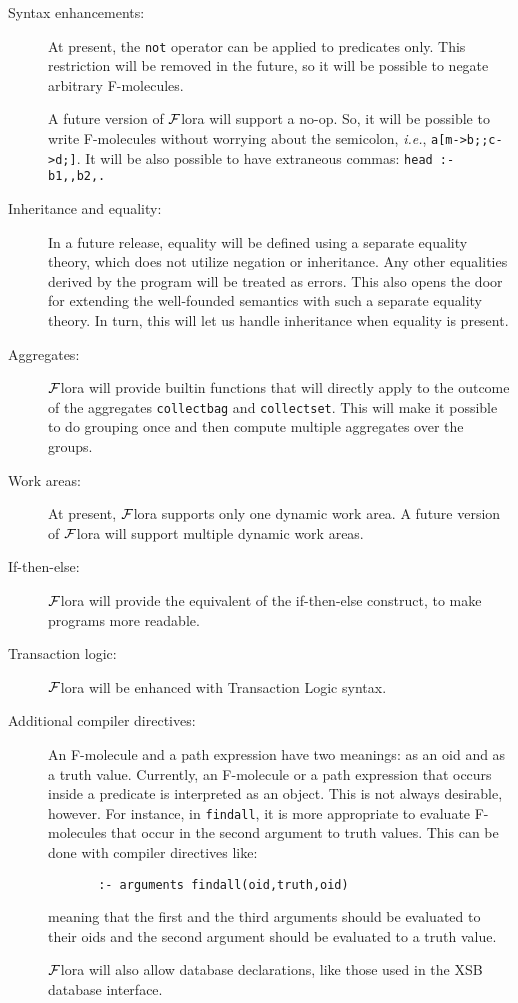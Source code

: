 \documentclass[11pt]{article}
\newcommand{\FLORA}{{\mbox{${\cal F}${\sc lora}}}\xspace}
\begin{document}
\begin{description}
  \item  [Syntax enhancements:]
    At present, the {\tt not} operator can be applied to predicates only.
    This restriction will be removed in the future, so it will be possible
    to negate arbitrary F-molecules.

    A future version of \FLORA will support a no-op. So, it will be possible
    to write F-molecules without worrying about the semicolon, {\it i.e.}, 
    {\tt a[m->b;;c->d;]}. It will be also possible to have extraneous commas:
    {\tt head :- b1,,b2,.}
  \item[Inheritance and equality:] In a future release, equality will be
    defined using a separate equality theory, which does not utilize
    negation or inheritance. Any other equalities derived
    by the program will be treated as errors. This also opens the door for
    extending the well-founded semantics with such a separate equality
    theory. In turn, this will let us handle inheritance when equality is
    present.
  \item[Aggregates:] \FLORA will provide builtin functions that will
    directly apply to the outcome of the aggregates {\tt collectbag} and
    {\tt collectset}. This will make it possible to do grouping once and
    then compute multiple aggregates over the groups.
  \item[Work areas:] At present, \FLORA supports only one dynamic work area.
    A future version of \FLORA will support multiple dynamic work areas.
  \item[If-then-else:] \FLORA will provide the equivalent of the
    if-then-else construct, to make programs more readable.
  \item[Transaction logic:] \FLORA will be enhanced with Transaction Logic
    syntax.
  \item[Additional compiler directives:] An F-molecule and a path
    expression have two meanings: as an oid and as a truth value.
    Currently, an F-molecule or a path expression that occurs inside a
    predicate is interpreted as an object. This is not always desirable,
    however. For instance, in {\tt findall}, it is more appropriate to
    evaluate F-molecules that occur in the second argument to truth values.
    This can be done with compiler directives like:
    \begin{verbatim}
       :- arguments findall(oid,truth,oid)
    \end{verbatim}
    meaning that the first and the third arguments should be evaluated to
    their oids and the second argument should be evaluated to a truth
    value.

    \FLORA will also allow database declarations, like those 
    used in the XSB database interface.
\end{description}




\printindex
\end{document}
